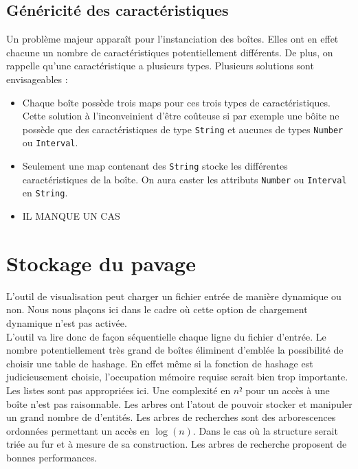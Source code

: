 \subsection{Généricité des caractéristiques}
Un problème majeur apparaît pour l'instanciation des boîtes. Elles ont en effet chacune un nombre de caractéristiques potentiellement différents. De plus, on rappelle qu'une caractéristique a plusieurs types. Plusieurs solutions sont envisageables : 
\begin{itemize}
 \item 
Chaque boîte possède trois maps pour ces trois types de caractéristiques. Cette solution à l'inconveinient d'être coûteuse si par exemple une bôite ne possède que des caractéristiques de type \verb+String+ et aucunes de types \verb+Number+ ou \verb+Interval+. 
 \item
Seulement une map contenant des \verb+String+ stocke les différentes caractéristiques de la boîte. On aura caster les attributs \verb+Number+ ou \verb+Interval+ en \verb+String+.
\item \huge{IL MANQUE UN CAS}
\end{itemize}


\section{Stockage du pavage}
L'outil de visualisation peut charger un fichier entrée de manière dynamique ou non. Nous nous plaçons ici dans le cadre où cette option de chargement dynamique n'est pas activée. \\ L'outil va lire donc de façon séquentielle chaque ligne du fichier d'entrée. 
Le nombre potentiellement très grand de boîtes éliminent d'emblée la possibilité de choisir  une table de hashage. En effet même si la fonction de hashage est judicieusement choisie, l'occupation mémoire requise serait bien trop importante. Les listes sont pas appropriées ici. Une complexité en $n²$ pour un accès à une boîte n'est pas raisonnable. Les arbres ont l'atout de pouvoir stocker et manipuler un grand nombre de d'entités. Les arbres de recherches sont des arborescences ordonnées permettant un accès en $\log(n)$. Dans le cas où la structure serait triée au fur et à mesure de sa construction. Les arbres de recherche proposent de bonnes performances.



